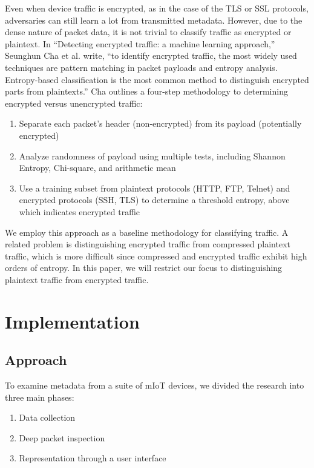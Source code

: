 Even when device traffic is encrypted, as in the case of the TLS or SSL protocols, adversaries can still learn a lot from transmitted metadata. However, due to the dense nature of packet data, it is not trivial to classify traffic as encrypted or plaintext. In ``Detecting encrypted traffic: a machine learning approach,'' Seunghun Cha et al. write, ``to identify encrypted traffic, the most widely used techniques are pattern matching in packet payloads and entropy analysis. Entropy-based classification is the most common method to distinguish encrypted parts from plaintexts.'' Cha outlines a four-step methodology to determining encrypted versus unencrypted traffic:

\begin{enumerate}
  \item Separate each packet's header (non-encrypted) from its payload (potentially encrypted)
  \item Analyze randomness of payload using multiple tests, including Shannon Entropy, Chi-square, and arithmetic mean
  \item Use a training subset from plaintext protocols (HTTP, FTP, Telnet) and encrypted protocols (SSH, TLS) to determine a threshold entropy, above which indicates encrypted traffic
\end{enumerate}

We employ this approach as a baseline methodology for classifying traffic. A related problem is distinguishing encrypted traffic from compressed plaintext traffic, which is more difficult since compressed and encrypted traffic exhibit high orders of entropy. In this paper, we will restrict our focus to distinguishing plaintext traffic from encrypted traffic.  

\section{Implementation}

\subsection{Approach}

To examine metadata from a suite of mIoT devices, we divided the research into three main phases: 

\begin{enumerate}
  \item Data collection
  \item Deep packet inspection
  \item Representation through a user interface
\end{enumerate}

